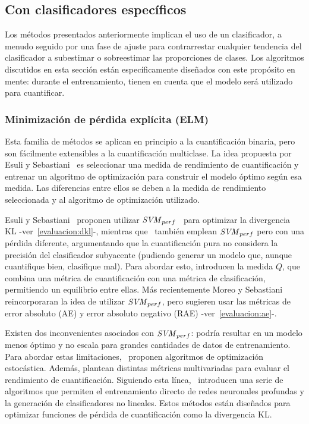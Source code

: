 \subsection{Con clasificadores específicos}\label{estimacion:especificos}

Los métodos presentados anteriormente implican el uso de un clasificador, a
menudo seguido por una fase de ajuste para contrarrestar cualquier tendencia del
clasificador a subestimar o sobreestimar las proporciones de clases. Los
algoritmos discutidos en esta sección están específicamente diseñados con este
propósito en mente: durante el entrenamiento, tienen en cuenta que el modelo
será utilizado para cuantificar.

\subsubsection{Minimización de pérdida explícita (ELM)}\label{estimacion:elm}

Esta familia de métodos se aplican en principio a la cuantificación binaria,
pero son fácilmente extensibles a la cuantificación multiclase. La idea
propuesta por Esuli y Sebastiani~\cite{esuli2010sentiment} es seleccionar una
medida de rendimiento de cuantificación y entrenar un algoritmo de optimización
para construir el modelo óptimo según esa medida. Las diferencias entre ellos se
deben a la medida de rendimiento seleccionada y al algoritmo de optimización
utilizado.

Esuli y Sebastiani~\cite{esuli2010sentiment, esuli2014explicit,
esuli2015optimizing} proponen utilizar \({\it SVM
\/}_{perf}\)~\cite{joachims2005support} para optimizar la divergencia KL
-ver~\ref{evaluacion:dkl}-, mientras que~\citet{barranquero2015quantification}
también emplean \({\it SVM \/}_{perf}\) pero con una pérdida diferente,
argumentando que la cuantificación pura no considera la precisión del
clasificador subyacente (pudiendo generar un modelo que, aunque cuantifique
bien, clasifique mal). Para abordar esto, introducen la medida \(Q\), que
combina una métrica de cuantificación con una métrica de clasificación,
permitiendo un equilibrio entre ellas. Más recientemente Moreo y
Sebastiani~\cite{moreo2021re} reincorporaran la idea de utilizar \({\it SVM
\/}_{perf}\), pero sugieren usar las métricas de error absoluto (AE) y error
absoluto negativo (RAE) -ver~\ref{evaluacion:ae}-.

Existen dos inconvenientes asociados con \({\it SVM \/}_{perf}\): podría
resultar en un modelo menos óptimo y no escala para grandes cantidades de datos
de entrenamiento. Para abordar estas limitaciones,~\citet{kar2016online}
proponen algoritmos de optimización estocástica. Además, plantean distintas
métricas multivariadas para evaluar el rendimiento de cuantificación. Siguiendo
esta línea,~\citet{sanyal2018optimizing} introducen una serie de algoritmos que
permiten el entrenamiento directo de redes neuronales profundas y la generación
de clasificadores no lineales. Estos métodos están diseñados para optimizar
funciones de pérdida de cuantificación como la divergencia KL.\@

